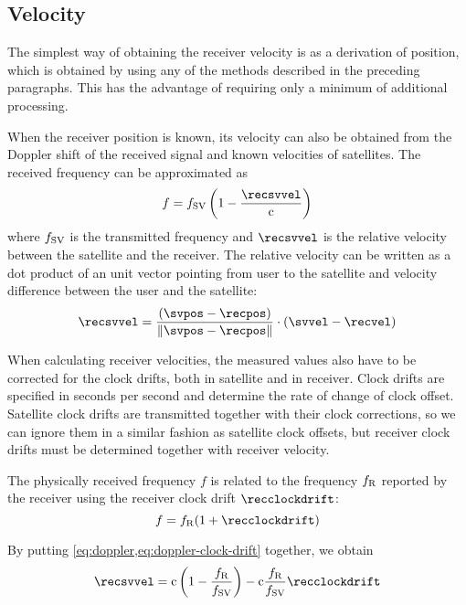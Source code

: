 \subsection{Velocity}
The simplest way of obtaining the receiver velocity is as a derivation of
position, which is obtained by using any of the methods described in the preceding paragraphs.
This has the advantage of requiring only a minimum of additional processing.

When the receiver position is known, its velocity can also be obtained from the Doppler shift of
the received signal and known velocities of satellites.
The received frequency can be approximated as
\begin{equation}
	f = f_\SV \left(1 - \frac{\recsvvel}{\speedoflight}\right)
	\label{eq:doppler}
\end{equation}
where \(f_{\mathrm{SV}}\) is the transmitted frequency and \(\recsvvel\) is the relative velocity
between the satellite and the receiver.
The relative velocity can be written as a dot product of an unit vector pointing
from user to the satellite and velocity difference between the user and the satellite:
\begin{equation}
	\recsvvel = \frac{
		(\svpos - \recpos)
	}{
		\norm{\svpos - \recpos}
	} \cdot (\svvel - \recvel)
	\label{eq:doppler-velocity}
\end{equation}

When calculating receiver velocities, the measured values also have to be corrected for
the clock drifts, both in satellite and in receiver.
Clock drifts are specified in seconds per second and determine the rate of change of clock offset.
Satellite clock drifts are transmitted together with their clock corrections, so we can ignore
them in a similar fashion as satellite clock offsets, but receiver clock drifts must be determined
together with receiver velocity.

The physically received frequency \(f\) is related to the frequency \(f_{\mathrm{R}}\) reported by the receiver
using the receiver clock drift \(\recclockdrift\):
\begin{equation}
	f = f_\REC ( 1 + \recclockdrift)
	\label{eq:doppler-clock-drift}
\end{equation}

By putting \cref{eq:doppler,eq:doppler-clock-drift}
together, we obtain
\begin{equation}
    \label{eq:doppler2}
	\recsvvel
	=
	\speedoflight \left(1 - \frac{f_\REC}{f_\SV}\right) -
	\speedoflight \frac{f_\REC}{f_\SV} \recclockdrift
\end{equation}

